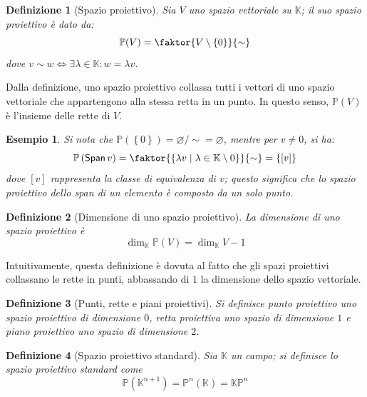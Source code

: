 \documentclass[11pt]{scrartcl}
\theoremstyle{style1}
\newtheorem{definizione}{Definizione}[section]
\newtheorem{esempio}{Esempio}[section]
\numberwithin{equation}{subsection}
\renewcommand{\operatorname}[1]{\mathop{\mathrm{\textsf{#1}}}}
\begin{document}
\begin{definizione}
	[Spazio proiettivo]
	Sia $V$ uno spazio vettoriale su $\mathbb{K}$; il suo \textit{spazio proiettivo} \`e dato da:
	\[
		\mathbb{P}( V) = \faktor{V \setminus \left\{ 0 \right\} }{\sim}
	\] 
	dove $v\sim w \iff \exists \lambda \in \mathbb{K} : w = \lambda v$.
\end{definizione}
\noindent Dalla definizione, uno spazio proiettivo collassa tutti i vettori di uno spazio vettoriale che appartengono alla stessa retta in un punto.
In questo senso, $\mathbb{P} (V)$ \`e l'insieme delle rette di $V$.
\begin{esempio}
Si nota che $\mathbb{P} \left(\left\{ 0 \right\} \right) = \varnothing / {\sim} = \varnothing$, mentre per $v\neq 0$, si ha:
\[
	\mathbb{P}\left(\operatorname{Span} v\right) = \faktor{\left\{ \lambda v  \mid \lambda \in \mathbb{K}\setminus 0 \right\} }{\sim} = \left\{ \left[ v \right]  \right\} 
\] 
dove $\left[ v \right] $ rappresenta la classe di equivalenza di $v$; questo significa che lo spazio proiettivo dello span di un elemento \`e composto da un solo punto.
\end{esempio}
\begin{definizione}
	[Dimensione di uno spazio proiettivo]
	La dimensione di uno spazio proiettivo \`e
	\[
	\dim_{\mathbb{K}} \mathbb{P}(V) = \dim_{\mathbb{K}} V - 1
	\] 
\end{definizione}
\noindent Intuitivamente, questa definizione \`e dovuta al fatto che gli spazi proiettivi collassano le rette in punti, abbassando di $1$ la dimensione dello spazio vettoriale.

\begin{definizione}
	[Punti, rette e piani proiettivi]
	Si definisce \textit{punto proiettivo} uno spazio proiettivo di dimensione $0$, \textit{retta proiettiva} uno spazio di dimensione $1$ e \textit{piano proiettivo} uno spazio di dimensione $2$.
\end{definizione}
\begin{definizione}
	[Spazio proiettivo standard]
	Sia $\mathbb{K}$ un campo; si definisce lo \textit{spazio proiettivo standard} come
	\[
	\mathbb{P}(\mathbb{K}^{n+1} ) = \mathbb{P}^n(\mathbb{K}) = \mathbb{K}\mathbb{P}^n
	\] 
\end{definizione}
\end{document}
